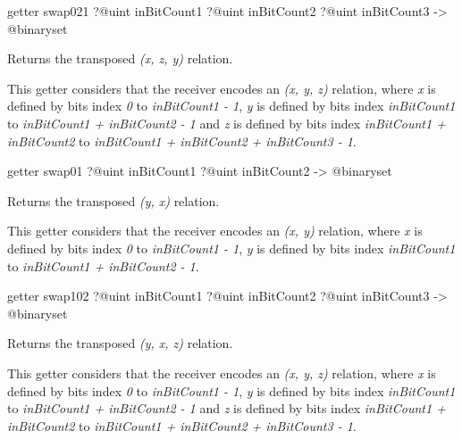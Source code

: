 
\begin{galgas}
getter swap021
  ?@uint inBitCount1
  ?@uint inBitCount2
  ?@uint inBitCount3
  -> @binaryset
\end{galgas}



Returns the transposed \emph{(x, z, y)} relation.

This getter considers that the receiver encodes an \emph{(x, y, z)} relation, where \emph{x} is defined by bits index \emph{0} to \emph{inBitCount1  - 1}, \emph{y} is defined by bits index \emph{inBitCount1} to \emph{inBitCount1 + inBitCount2 - 1} and  \emph{z} is defined by bits index \emph{inBitCount1 + inBitCount2} to \emph{inBitCount1 + inBitCount2 + inBitCount3 - 1}.








\begin{galgas}
getter swap01 ?@uint inBitCount1 ?@uint inBitCount2 -> @binaryset
\end{galgas}


Returns the transposed \emph{(y, x)} relation.

This getter considers that the receiver encodes an \emph{(x, y)} relation, where \emph{x} is defined by bits index \emph{0} to \emph{inBitCount1  - 1}, \emph{y} is defined by bits index \emph{inBitCount1} to \emph{inBitCount1 + inBitCount2 - 1}.






\begin{galgas}
getter swap102
  ?@uint inBitCount1
  ?@uint inBitCount2
  ?@uint inBitCount3
  -> @binaryset
\end{galgas}

Returns the transposed \emph{(y, x, z)} relation.

This getter considers that the receiver encodes an \emph{(x, y, z)} relation, where \emph{x} is defined by bits index \emph{0} to \emph{inBitCount1  - 1}, \emph{y} is defined by bits index \emph{inBitCount1} to \emph{inBitCount1 + inBitCount2 - 1} and  \emph{z} is defined by bits index \emph{inBitCount1 + inBitCount2} to \emph{inBitCount1 + inBitCount2 + inBitCount3 - 1}.






